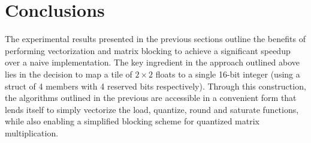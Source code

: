 \section{Conclusions}
The experimental results presented in the previous sections outline the benefits of performing vectorization and matrix blocking to achieve a significant speedup over a naive implementation. The key ingredient in the approach outlined above lies in the decision to map a tile of $2 \times 2$ floats to a single 16-bit integer (using a struct of 4 members with 4 reserved bits respectively). Through this construction, the algorithms outlined in the previous are accessible in a convenient form that lends itself to simply vectorize the load, quantize, round and saturate functions, while also enabling a simplified blocking scheme for quantized matrix multiplication.